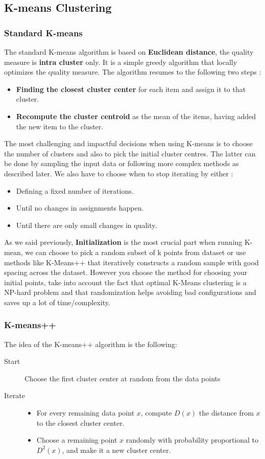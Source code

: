 \subsection{K-means Clustering}

\subsubsection{Standard K-means}

The standard K-means algorithm is based on \textbf{Euclidean distance}, the quality measure is \textbf{intra cluster} only. It is a simple greedy algorithm that locally optimizes the quality measure. The algorithm resumes to the following two steps :
\begin{itemize}
	\item \textbf{Finding the closest cluster center} for each item and assign it to that cluster.
	\item \textbf{Recompute the cluster centroid} as the mean of the items, having added the new item to the cluster.
\end{itemize}
The most challenging and impactful decisions when using K-means is to choose the number of clusters and also to pick the initial cluster centres. The latter can be done by sampling the input data or following more complex methods as described later. We also have to choose when to stop iterating by either :
\begin{itemize}
	\item Defining a fixed number of iterations.
	\item Until no changes in assignments happen.
	\item Until there are only small changes in quality.
\end{itemize}
As we said previously, \textbf{Initialization} is the most crucial part when running K-mean, we can choose to pick a random subset of k points from dataset or use methods like K-Means++ that iteratively constructs a random sample with good spacing across the dataset. However you choose the method for choosing your initial points, take into account the fact that optimal K-Means clustering is a NP-hard problem and that randomization helps avoiding bad configurations and saves up a lot of time/complexity.

\subsubsection{K-means++}
The idea of the K-means++ algorithm is the following:
\begin{description}
 \item[Start] Choose the first cluster center at random from the data points
 \item[Iterate] 
 \begin{itemize}
  \item For every remaining data point $x$, compute $D(x)$ the distance from $x$ to the closest cluster center.
  \item Choose a remaining point $x$ randomly with probability proportional to $D^2(x)$, and make it a new cluster center.
 \end{itemize}
\end{description}

